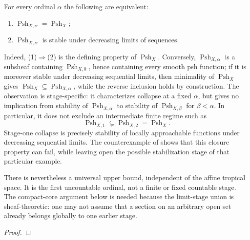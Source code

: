 \begin{remark}
\label{rem:ch16-collapse-reduction}
For every ordinal $\alpha$ the following are equivalent:
\begin{enumerate}
\item $\operatorname{Psh}_{X,\alpha}=\operatorname{Psh}_X$;
\item $\operatorname{Psh}_{X,\alpha}$ is stable under decreasing limits of
 sequences.
\end{enumerate}
Indeed, (1)$\Rightarrow$(2) is the defining property of
$\operatorname{Psh}_X$.  Conversely, $\operatorname{Psh}_{X,\alpha}$ is a
subsheaf containing $\operatorname{Psh}_{X,0}$, hence containing every
smooth psh function; if it is moreover stable under decreasing sequential
limits, then minimality of $\operatorname{Psh}_X$ gives
$\operatorname{Psh}_X\subseteq\operatorname{Psh}_{X,\alpha}$, while the
reverse inclusion holds by construction.  The observation is
stage-specific: it characterizes collapse at a fixed $\alpha$, but gives no
implication from stability of $\operatorname{Psh}_{X,\alpha}$ to stability
of $\operatorname{Psh}_{X,\beta}$ for $\beta<\alpha$.  In particular, it
does not exclude an intermediate finite regime such as
\[
  \operatorname{Psh}_{X,1}\subsetneq
  \operatorname{Psh}_{X,2}=\operatorname{Psh}_X.
\]
Stage-one collapse is precisely stability of locally approachable functions
under decreasing sequential limits.  The counterexample of
 shows that this closure property
can fail, while leaving open the possible stabilization stage of that
particular example.
\end{remark}

There is nevertheless a universal upper bound, independent of the affine
tropical space.  It is the first uncountable ordinal, not a finite or fixed
countable stage.  The compact-core argument below is needed because the
limit-stage union is sheaf-theoretic: one may not assume that a section on
an arbitrary open set already belongs globally to one earlier stage.

\begin{theorem}
\label{thm:p072-omega1-uniform-bound}

\end{theorem}

\begin{proof}

\end{proof}

